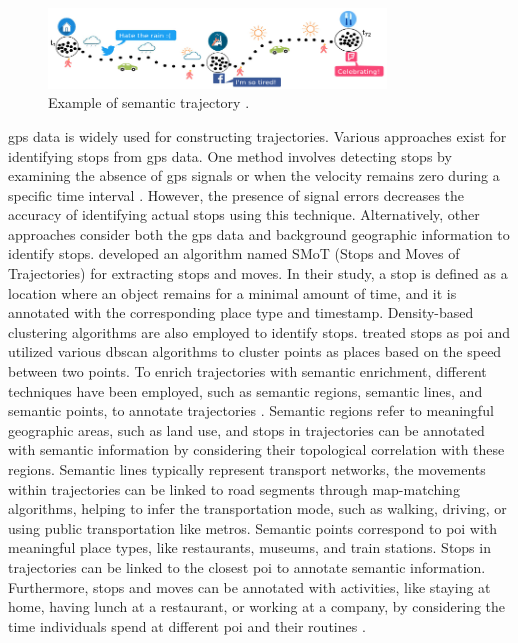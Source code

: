 \documentclass{article}
\begin{document}
\begin{figure}
\centering
\includegraphics[width=0.8\textwidth]{figures/semantic_trajectory_example.png}
\caption{\label{fig:semantic_trajectory_example}Example of semantic trajectory \citep{ferrero_mastermovelets_2020}.}
\end{figure}

\acrfull{gps} data is widely used for constructing trajectories. Various approaches exist for identifying stops from \acrshort{gps} data. One method involves detecting stops by examining the absence of \acrshort{gps} signals or when the velocity remains zero during a specific time interval \citep{ashbrook_using_2003}. However, the presence of signal errors decreases the accuracy of identifying actual stops using this technique. Alternatively, other approaches consider both the \acrshort{gps} data and background geographic information to identify stops. \cite{alvares_model_2007} developed an algorithm named SMoT (Stops and Moves of Trajectories) for extracting stops and moves. In their study, a stop is defined as a location where an object remains for a minimal amount of time, and it is annotated with the corresponding place type and timestamp. Density-based clustering algorithms are also employed to identify stops. \cite{palma_clustering-based_2008} treated stops as \acrshort{poi} and utilized various \acrshort{dbscan} algorithms to cluster points as places based on the speed between two points. To enrich trajectories with semantic enrichment, different techniques have been employed, such as semantic regions, semantic lines, and semantic points, to annotate trajectories \citep{yan_semantic_2013}. Semantic regions refer to meaningful geographic areas, such as land use, and stops in trajectories can be annotated with semantic information by considering their topological correlation with these regions. Semantic lines typically represent transport networks, the movements within trajectories can be linked to road segments through map-matching algorithms, helping to infer the transportation mode, such as walking, driving, or using public transportation like metros. Semantic points correspond to \acrshort{poi} with meaningful place types, like restaurants, museums, and train stations. Stops in trajectories can be linked to the closest \acrshort{poi} to annotate semantic information. Furthermore, stops and moves can be annotated with activities, like staying at home, having lunch at a restaurant, or working at a company, by considering the time individuals spend at different \acrshort{poi} and their routines \cite{parent_semantic_2013}.
\end{document}
